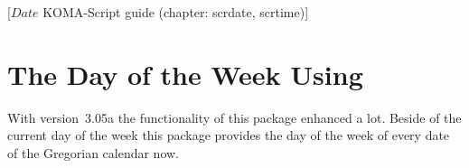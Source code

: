 %
%
%
%
%
%
%
%
% 
%
%
%
%

                 [$Date$
                  KOMA-Script guide (chapter: scrdate, scrtime)]


\chapter{The Day of the Week Using }

With version~3.05a the functionality of this package enhanced a lot. Beside of
the current day of the week this package provides the
day of the week of every date of the Gregorian calendar now.

